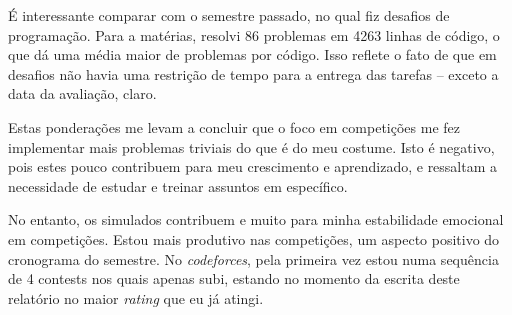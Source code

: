 \documentclass{article}
\begin{document}
É interessante comparar com o semestre passado, no qual fiz desafios
de programação. Para a matérias, resolvi 86 problemas em 4263 linhas
de código, o que dá uma média maior de problemas por código. Isso
reflete o fato de que em desafios não havia uma restrição de tempo
para a entrega das tarefas -- exceto a data da avaliação, claro.

Estas ponderações me levam a concluir que o foco em competições
me fez implementar mais problemas triviais do que é do meu costume.
Isto é negativo, pois estes pouco contribuem para meu crescimento
e aprendizado, e ressaltam a necessidade de estudar e treinar assuntos
em específico.

No entanto, os simulados contribuem e muito para minha estabilidade
emocional em competições. Estou mais produtivo nas competições, um aspecto
positivo do cronograma do semestre. No {\em codeforces}, pela primeira vez
estou numa sequência de 4 contests nos quais apenas subi, estando no momento 
da escrita deste relatório no maior {\em rating} que eu já atingi.
\end{document}
